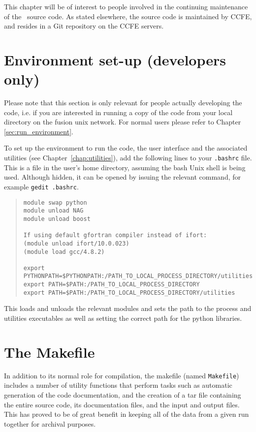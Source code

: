 \label{chap:codetools}

This chapter will be of interest to people involved in the continuing
maintenance of the \process\ source code. As stated elsewhere, the source code
is maintained by CCFE, and resides in a Git repository on the CCFE servers.

\section{Environment set-up (developers only)}
\label{sec:run_environment_dev}

Please note that this section is only relevant for people actually developing the \process\/ code, i.e. if you are interested in running a copy of the code from your local directory on the fusion unix network. For normal users please refer to Chapter \ref{sec:run_environment}.

To set up the environment to run the code, the user interface and the associated utilities (see Chapter~\ref{chap:utilities}), add the following lines to your \texttt{.bashrc} file.  This is a file in the user's home directory, assuming the bash Unix shell is being used.  Although hidden, it can be opened by issuing the relevant command, for example \texttt{gedit .bashrc}.
\begin{quote}
\begin{verbatim}
module swap python
module unload NAG
module unload boost

If using default gfortran compiler instead of ifort:
(module unload ifort/10.0.023)
(module load gcc/4.8.2)

export PYTHONPATH=$PYTHONPATH:/PATH_TO_LOCAL_PROCESS_DIRECTORY/utilities
export PATH=$PATH:/PATH_TO_LOCAL_PROCESS_DIRECTORY
export PATH=$PATH:/PATH_TO_LOCAL_PROCESS_DIRECTORY/utilities
\end{verbatim}
\end{quote}

This loads and unloads the relevant modules and sets the path to the process and utilities executables as well as setting the correct path for the python libraries.


\section{The Makefile}
\label{sec:makefile}

In addition to its normal role for compilation, the makefile (named
\texttt{Makefile}) includes a number of utility functions that perform tasks
such as automatic generation of the code documentation, and the creation of a
tar file containing the entire source code, its documentation files, and the
input and output files. This has proved to be of great benefit in keeping all
of the data from a given run together for archival purposes.

